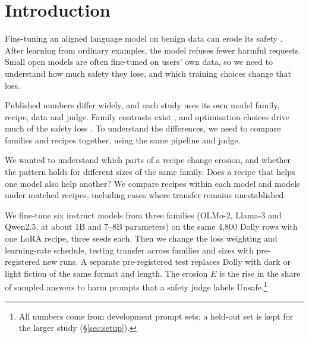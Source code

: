 \documentclass{article}
\begin{document}
\section{Introduction}
\label{sec:intro}

Fine-tuning an aligned language model on benign data can erode its safety
\citep{qi2024finetuning,he2024safe}. After learning from ordinary examples,
the model refuses fewer harmful requests. Small open models are often
fine-tuned on users' own data, so we need to understand how much safety
they lose, and which training choices change that loss.

Published numbers differ widely, and each study uses its own model family,
recipe, data and judge. Family contrasts exist
\citep{hawkins2026heterogeneoussafetyimpactsbenign,khan2026safetydriftfinetuningevidence,guo2026safety},
and optimisation choices drive much of the safety loss
\citep{kim2025rethinking}. To understand the differences, we need to compare
families and recipes together, using the same pipeline and judge.

We wanted to understand which parts of a recipe change erosion, and whether
the pattern holds for different sizes of the same family. Does a recipe that
helps one model also help another? We compare recipes within each model and
models under matched recipes, including cases where transfer remains
unestablished.

We fine-tune six instruct models from three families (OLMo-2, Llama-3 and
Qwen2.5, at about 1B and 7--8B parameters) on the same 4,800 Dolly rows with
one LoRA recipe, three seeds each. Then we change the loss weighting and
learning-rate schedule, testing transfer across families and sizes with
pre-registered new runs. A separate pre-registered test replaces Dolly with
dark or light fiction of the same format and length.
The erosion $E$ is the rise in the share of sampled answers to harm
prompts that a safety judge labels Unsafe.\footnote{All numbers come from
development prompt sets; a held-out set is kept for the larger study
(\S\ref{sec:setup}).}
\end{document}
